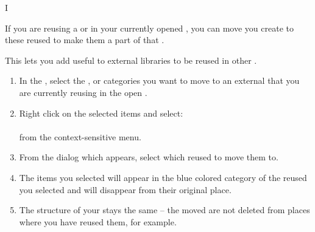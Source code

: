 I

If you are reusing a \gdproject{} or \gdprojects{} in your currently opened \gdproject{} , you can move \gdcases{} you create to these reused \gdprojects{} to make them a part of that \gdproject{}. 

This lets you add useful \gdcases{} to external libraries to be reused in other \gdprojects{}. 


\begin{enumerate}
\item In the \gdtestcasebrowser{}, select the \gdcase{}, \gdcases{} or categories you want to move to an external \gdproject{} that you are currently reusing in the open \gdproject{}. 
\item Right click on the selected items and select:\\
\\
from the context-sensitive menu. 
\item From the dialog which appears, select which reused \gdproject{} to move them to. 
\item The items you selected will appear in the blue colored category of the reused \gdproject{} you selected and will disappear from their original place. 
\item The structure of your \gdproject{} stays the same -- the moved \gdcases{} are not deleted from places where you have reused them, for example. 
\end{enumerate}
